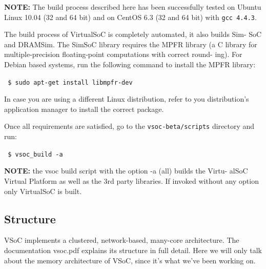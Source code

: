 \documentclass{article}
\begin{document}
{
\addtolength{\leftskip}{12.5mm}

{\bf NOTE:} The build process described here has been successfully tested on Ubuntu Linux 10.04 (32 and 64 bit) and on CentOS 6.3 (32 and 64 bit) with \texttt{gcc 4.4.3}.

The build process of VirtualSoC is completely automated, it also builds Sim-
SoC and DRAMSim. The SimSoC library requires the MPFR library (a C
library for multiple-precision floating-point computations with correct round-
ing). For Debian based systems, run the following command to install the
MPFR library:

\hspace{5mm}\texttt{
\$ sudo apt-get install libmpfr-dev
}



In case you are using a different Linux distribution, refer to you distribution’s
application manager to install the correct package.

Once all requirements are satisfied,  go to the \texttt{vsoc-beta/scripts} directory and run:

\hspace{5mm}\texttt{
\$ vsoc\_build -a
}

{\bf NOTE:} the vsoc build script with the option -a (all) builds the Virtu-
alSoC Virtual Platform as well as the 3rd party libraries. If invoked without
any option only VirtualSoC is built.

}


\newpage
\subsection{Structure}

VSoC implements a clustered, network-based, many-core architecture. The documentation vsoc.pdf \cite{vsoc} explains its structure in full detail. Here we will only talk about the memory architecture of VSoC, since it's what we've been working on.
\end{document}
